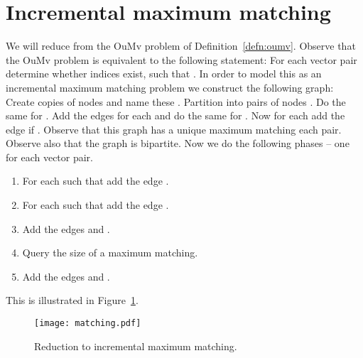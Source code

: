 \documentclass[a4paper,11pt]{article}
\theoremstyle{definition}
\begin{document}
\section{Incremental maximum matching}
We will reduce from the OuMv problem of Definition~\ref{defn:oumv}.
Observe that the OuMv problem is equivalent to the following statement:
For each vector pair  determine whether indices  exist, such that
. In order to model this as an incremental maximum
matching problem we construct the following graph:
Create  copies of  nodes and name these .
Partition  into  pairs of nodes . Do the same for . Add the edges  for
each  and do the same for . Now for each  add the edge  if . Observe that this graph has a unique maximum
matching each  pair. Observe also that the graph is bipartite.
Now we do the following  phases -- one for each  vector pair.
\begin{enumerate}
    \item For each  such that  add the edge .
    \item For each  such that  add the edge
        .
    \item Add the edges  and .
    \item Query the size of a maximum matching.
    \item Add the edges  and .
\end{enumerate}
This is illustrated in Figure~\ref{fig:matching}.

\begin{figure}[htbp]
    \centering
    \texttt{[image: matching.pdf]}
    \caption{Reduction to incremental maximum matching.}
    \label{fig:matching}
\end{figure}
\end{document}
